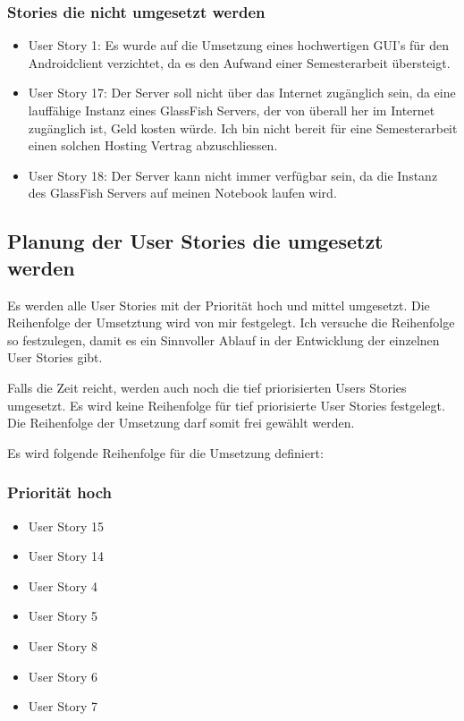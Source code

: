 \documentclass[listof=totocnumbered, bibliography=totocnumbered]{scrreprt}
\begin{document}
  \subsubsection{Stories die nicht umgesetzt werden}
  
  \begin{itemize}
    \item User Story 1: Es wurde auf die Umsetzung eines hochwertigen
    \ac{GUI}'s für den Androidclient verzichtet, da es den Aufwand einer
    Semesterarbeit übersteigt.
    \item User Story 17: Der Server soll nicht über das Internet zugänglich
    sein, da eine lauffähige Instanz eines GlassFish Servers, der von überall
    her im Internet zugänglich ist, Geld kosten würde. Ich bin nicht bereit für
    eine Semesterarbeit einen solchen Hosting Vertrag abzuschliessen.
    \item User Story 18: Der Server kann nicht immer verfügbar sein, da die
    Instanz des GlassFish Servers auf meinen Notebook laufen wird.
  \end{itemize}
  
  \subsection{Planung der User Stories die umgesetzt werden}
  
  Es werden alle User Stories mit der Priorität hoch und mittel umgesetzt. Die
  Reihenfolge der Umsetztung wird von mir festgelegt. Ich versuche die
  Reihenfolge so festzulegen, damit es ein Sinnvoller Ablauf in der Entwicklung
  der einzelnen User Stories gibt.
  
  Falls die Zeit reicht, werden auch noch die tief priorisierten Users Stories
  umgesetzt. Es wird keine Reihenfolge für tief priorisierte User Stories
  festgelegt. Die Reihenfolge der Umsetzung darf somit frei gewählt werden.\newline
  
  Es wird folgende Reihenfolge für die Umsetzung definiert:

  \subsubsection{Priorität hoch}
  
  \begin{itemize}
    \item User Story 15
    \item User Story 14
    \item User Story 4
    \item User Story 5
    \item User Story 8
    \item User Story 6
    \item User Story 7
  \end{itemize}
  
\end{document}
